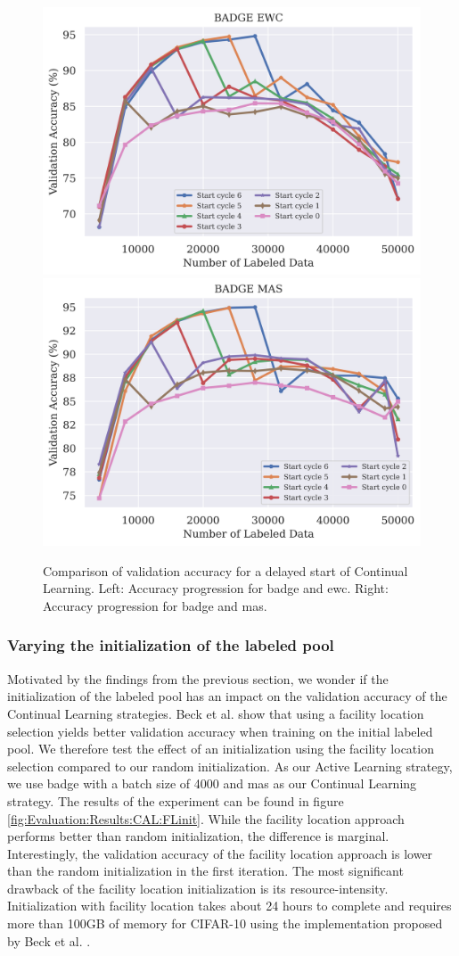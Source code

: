 \begin{figure}[h]
    \centering
    \includegraphics[width=0.45\linewidth]{images/results_CAL/delayed_start_badge_ewc.png} \hfill
    \includegraphics[width=0.45\linewidth]{images/results_CAL/delayed_start_badge_mas.png}
    \caption[Continual Active Learning Hybrid approach]{Comparison of validation accuracy for a delayed start of Continual Learning. Left: Accuracy progression for \gls{badge} and \gls{ewc}. Right: Accuracy progression for \gls{badge} and \gls{mas}.}
    \label{fig:Evaluation:Results:CAL:DelayedStart}
\end{figure}

\subsubsection{Varying the initialization of the labeled pool}
\label{sec:Evaluation:Results:CAL:Initialization}
Motivated by the findings from the previous section, we wonder if the initialization of the labeled pool has an impact on the validation accuracy of the Continual Learning strategies. Beck et al.\cite{beck2021effective} show that using a facility location selection 
\cite{iyer2021submodular} yields better validation accuracy when training on the initial labeled pool. We therefore test the effect of an initialization using the facility location selection compared to our random initialization. As our Active Learning strategy,
we use \gls{badge} with a batch size of 4000 and \gls{mas} as our Continual Learning strategy. The results of the experiment can be found in figure \ref{fig:Evaluation:Results:CAL:FLinit}. While the facility location approach performs better than random initialization, the difference is
marginal. Interestingly, the validation accuracy of the facility location approach is lower than the random initialization in the first iteration. The most significant drawback of the facility location initialization is its resource-intensity. Initialization with facility
location takes about 24 hours to complete and requires more than 100GB of memory for CIFAR-10 using the implementation proposed by Beck et al. \cite{beck2021effective}. \par

